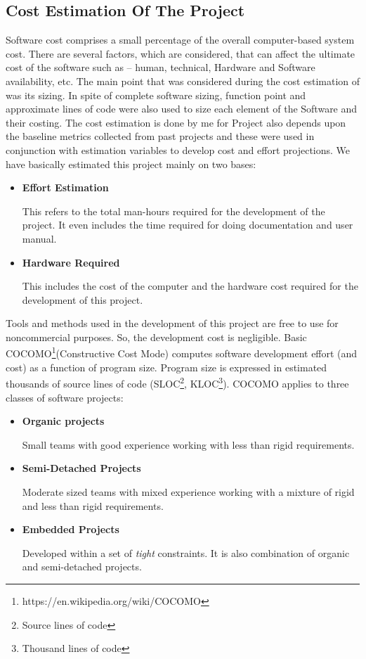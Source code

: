 		 \subsection{Cost Estimation Of The Project}
		 \vs
		 \hspace{1cm}Software cost comprises a small percentage of the overall computer-based system cost. There are several factors, which are considered, that can affect the ultimate cost of the software such as – human, technical, Hardware and Software availability, etc. The main point that was considered during the cost estimation of \textbf{\projectname}\space was its sizing. In spite of complete software sizing, function point and approximate lines of code were also used to size each element of the Software and their costing. The cost estimation is done by me for Project also depends upon the baseline metrics collected from past projects and these were used in conjunction with estimation variables to develop cost and effort projections.
		 \vs
		 We have basically estimated this project mainly on two bases:
		 \begin{itemize}
		 	\item 
		 	\textbf{\large Effort Estimation}
		 	
		 	This refers to the total man-hours required for the development of the project. It even includes the time required for doing documentation and user manual.
		 	\item 
		 	\textbf{\large Hardware Required}
		 	
		 	This includes the cost of the computer and the hardware cost required for the development of this project.		 	
		 \end{itemize}
	 Tools and methods used in the development of this project are free to use for noncommercial purposes. So, the development cost is negligible. Basic COCOMO\footnote{https://en.wikipedia.org/wiki/COCOMO}(Constructive Cost Mode) computes software development effort (and cost) as a function of program size. Program size is expressed in estimated thousands of source lines of code (SLOC\footnote{Source lines of code}, KLOC\footnote{Thousand lines of code}). 
	 \vs
	 COCOMO applies to three classes of software projects: 
	 \begin{itemize}
	 	\item 
	 	\textbf{\large Organic projects}
	 	
	 	Small teams with good experience working with less than rigid requirements. 

	 	
	 	\item 
	 	\textbf{\large Semi-Detached Projects}
	 	
	 	Moderate sized teams with mixed experience working with a mixture of rigid and less than rigid requirements.
	 	
	 	\item 
	 	\textbf{\large Embedded Projects}
	 	
	 	Developed within a set of {\em tight} constraints. It is also combination of organic and semi-detached projects. 
	 	
	 \end{itemize}
